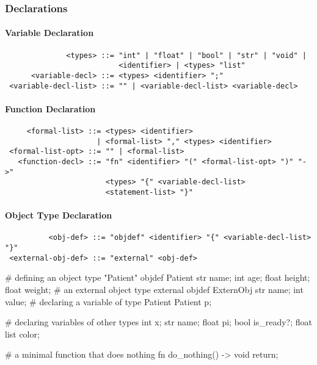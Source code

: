 \subsubsection{Declarations}

\paragraph{Variable Declaration}

\begin{verbatim}
              <types> ::= "int" | "float" | "bool" | "str" | "void" |
                          <identifier> | <types> "list"
      <variable-decl> ::= <types> <identifier> ";"
 <variable-decl-list> ::= "" | <variable-decl-list> <variable-decl>
\end{verbatim}

\paragraph{Function Declaration}

\begin{verbatim}
     <formal-list> ::= <types> <identifier>
                     | <formal-list> "," <types> <identifier>
 <formal-list-opt> ::= "" | <formal-list>
   <function-decl> ::= "fn" <identifier> "(" <formal-list-opt> ")" "->"
                       <types> "{" <variable-decl-list>
                       <statement-list> "}"
\end{verbatim}

\paragraph{Object Type Declaration}

\begin{verbatim}
          <obj-def> ::= "objdef" <identifier> "{" <variable-decl-list> "}"
 <external-obj-def> ::= "external" <obj-def>
\end{verbatim}

\begin{mylisting}
# defining an object type "Patient"
objdef Patient
{
  str   name;
  int   age;
  float height;
  float weight;
}
# an external object type
external objdef ExternObj
{
  str name;
  int value;
}
# declaring a variable of type Patient
Patient p;

# declaring variables of other types
int x;
str name;
float pi;
bool is_ready?;
float list color;

# a minimal function that does nothing
fn do_nothing() -> void
{
  return;
}
\end{mylisting}

